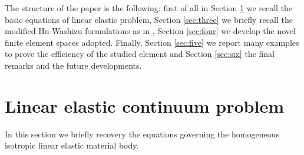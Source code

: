 \documentclass[preprint,12pt,authoryear]{elsarticle}
\begin{document}
The structure of the paper is the following: first of all in Section \ref{sec:two} we recall the basic equations of linear elastic problem, Section \ref{sec:three} we briefly recall the modified Hu-Washizu formulations as in \cite{lamichhane_three}, Section \ref{sec:four} we develop the novel finite element spaces adopted.
Finally, Section \ref{sec:five} we report many examples to prove the efficiency of the studied element and Section \ref{sec:six} the final remarks and the future developments.

\section{Linear elastic continuum problem}\label{sec:two}
In this section we briefly recovery the equations governing the homogeneous isotropic linear elastic material body. 
\end{document}
